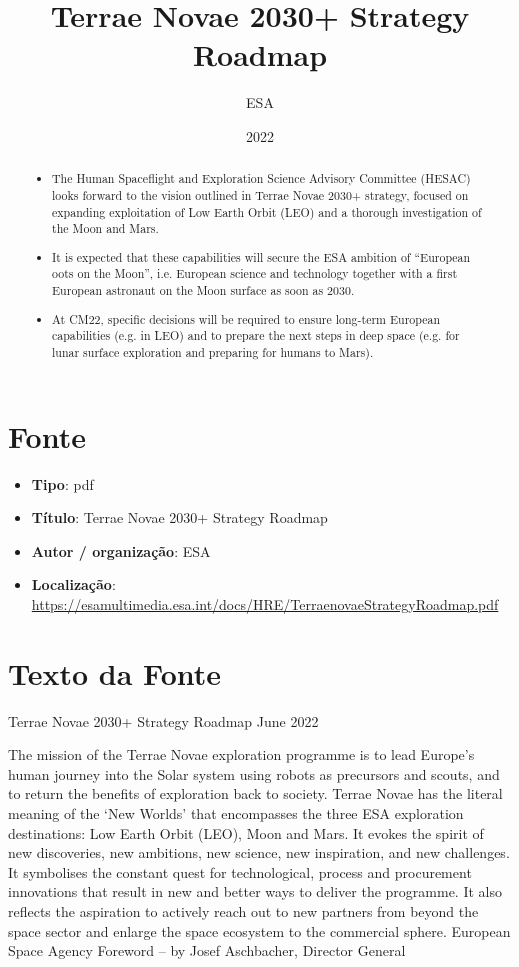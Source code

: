 \documentclass[12pt]{article}
\title{Terrae Novae 2030+ Strategy Roadmap}
\author{ESA}
\date{2022}
\begin{document}
\maketitle

\begin{abstract}
\begin{itemize}
\item The Human Spaceflight and Exploration Science Advisory Committee (HESAC) looks forward to the vision outlined in Terrae Novae 2030+ strategy, focused on expanding exploitation of Low Earth Orbit (LEO) and a thorough investigation of the Moon and Mars.
\item It is expected that these capabilities will secure the ESA ambition of “European oots on the Moon”, i.e. European science and technology together with a first European astronaut on the Moon surface as soon as 2030.
\item At CM22, specific decisions will be required to ensure long-term European capabilities (e.g. in LEO) and to prepare the next steps in deep space (e.g. for lunar surface exploration and preparing for humans to Mars).
\end{itemize}
\end{abstract}

\section{Fonte}

\begin{itemize}
\item \textbf{Tipo}: pdf
\item \textbf{Título}: Terrae Novae 2030+ Strategy Roadmap
\item \textbf{Autor / organização}: ESA
\item \textbf{Localização}: \url{https://esamultimedia.esa.int/docs/HRE/TerraenovaeStrategyRoadmap.pdf}
\end{itemize}

\section{Texto da Fonte}

Terrae Novae 2030+ Strategy Roadmap June 2022

The mission of the Terrae Novae exploration programme is to lead Europe’s human journey into the Solar system using robots as precursors and scouts, and to return the benefits of exploration back to society. Terrae Novae has the literal meaning of the ‘New Worlds’ that encompasses the three ESA exploration destinations: Low Earth Orbit (LEO), Moon and Mars. It evokes the spirit of new discoveries, new ambitions, new science, new inspiration, and new challenges. It symbolises the constant quest for technological, process and procurement innovations that result in new and better ways to deliver the programme. It also reflects the aspiration to actively reach out to new partners from beyond the space sector and enlarge the space ecosystem to the commercial sphere. European Space Agency Foreword – by Josef Aschbacher, Director General
\end{document}
